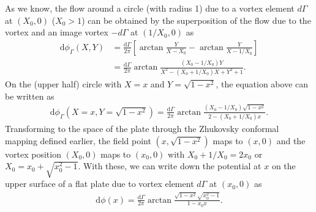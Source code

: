 As we know, the flow around a circle (with radius 1) due to a vortex element $d\Gamma$ at $(X_0, 0)$ ($X_0 > 1$) can be obtained by the superposition of the flow due to the vortex and an image vortex $-d\Gamma$ at $(1/X_0,0)$ as
\begin{align}
\mathrm{d}\phi_\Gamma (X,Y) & = \frac{\mathrm{d}\Gamma}{2\pi}[\arctan \frac{Y}{X-X_0} - \arctan \frac{Y}{X-1/X_0}]  \\
            & =  \frac{\mathrm{d}\Gamma}{2\pi}\arctan \frac{(X_0-1/X_0)Y}{X^2-(X_0+1/X_0)X+Y^2+1}.
\end{align}
On the (upper half) circle with $X = x$ and $Y = \sqrt{1-x^2}$, the equation above can be written as
\begin{align}
\mathrm{d}\phi_\Gamma (X = x,Y = \sqrt{1-x^2})  =  \frac{\mathrm{d}\Gamma}{2\pi}\arctan \frac{(X_0-1/X_0)\sqrt{1-x^2}}{2-(X_0+1/X_0)x}.
\end{align}
Transforming to the space of the plate through the Zhukovsky conformal mapping defined earlier, the field point $(x, \sqrt{1-x^2})$ maps to $(x, 0)$ and the vortex position $(X_0, 0)$ maps to $(x_0, 0)$ with $X_0 + 1/X_0 = 2x_0$ or $X_0 = x_0 + \sqrt{x_0^2-1}$.
With these, we can write down the potential at $x$ on the upper surface of a flat plate due to vortex element $d\Gamma$ at $(x_0, 0)$ as
\begin{align}
\mathrm{d}\phi (x) = \frac{\mathrm{d}\Gamma}{2\pi} \arctan \frac{\sqrt{1-x^2}\sqrt{x_0^2-1}}{1-x_0x}.
\end{align}

